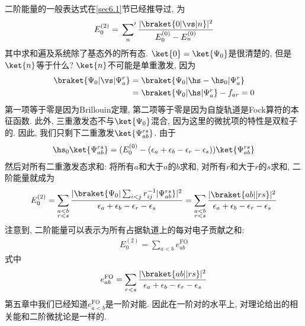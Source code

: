 二阶能量的一般表达式在\autoref{sec6.1}节已经推导过, 
为
\begin{align}
E_0^{(2)} = \sideset{}{'}\sum_n\frac{|\braket{0|\vs|n}|^2}{E_0^{(0)} - E_n^{(0)}}
\end{align}
其中求和遍及系统除了基态外的所有态. 
$\ket{0} = \ket{\Psi_0}$是很清楚的, 
但是$\ket{n}$等于什么? $\ket{n}$不可能是单重激发, 
因为
\begin{align*}
\braket{\Psi_0|\vs|\Psi_a^r} & = \braket{\Psi_0|\hs-\hs_0|\Psi_a^r} \\
                             & = \braket{\Psi_0|\hs|\Psi_a^r} - f_{ar} = 0
\end{align*}
第一项等于零是因为Brillouin定理, 
第二项等于零是因为自旋轨道是Fock算符的本征函数. 
此外, 
三重激发态不与$\ket{\Psi_0}$混合, 
因为这里的微扰项的特性是双粒子的. 
因此, 
我们只剩下二重激发$\ket{\Psi_{ab}^{rs}}$. 
由于
\begin{align*}
\hs_0\ket{\Psi_{ab}^{rs}} = (E_0^{(0)} - (\epsilon_a + \epsilon_b - \epsilon_r - \epsilon_s))\ket{\Psi_{ab}^{rs}}
\end{align*}
然后对所有二重激发态求和: 将所有$a$和大于$a$的$b$求和, 
对所有$r$和大于$r$的$s$求和, 
二阶能量就成为
\begin{align}
E_0^{(2)} = \sum_{\substack{a<b\\r<s}} \frac{|\braket{\Psi_0|\sum_{i<j} r_{ij}^{-1}|\Psi_{ab}^{rs}}|^2}{\epsilon_a + \epsilon_b -\epsilon_r-\epsilon_s} = \sum_{\substack{a<b\\r<s}} \frac{|\braket{ab||rs}|^2}{\epsilon_a + \epsilon_b -\epsilon_r-\epsilon_s}
\end{align}
注意到, 
二阶能量可以表示为所有占据轨道上的每对电子贡献之和:
\begin{align*}
E_0^{(2)} = \sum_{a<b}e_{ab}^\mathrm{FO}
\end{align*}
式中
\begin{align*}
e_{ab}^{\mathrm{FO}} =  \sum_{r<s} \frac{|\braket{ab||rs}|^2}{\epsilon_a + \epsilon_b -\epsilon_r-\epsilon_s}
\end{align*}
第五章中我们已经知道$e_{a<b}^\mathrm{FO}$是一阶对能. 
因此在一阶对的水平上, 
对理论给出的相关能和二阶微扰论是一样的.


